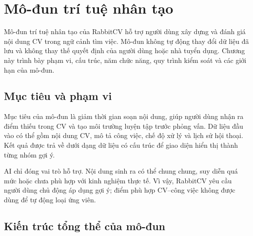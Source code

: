 \chapter{Mô-đun trí tuệ nhân tạo}
\label{chap:ai-module}

Mô-đun trí tuệ nhân tạo của RabbitCV hỗ trợ người dùng xây dựng và đánh giá nội dung CV trong ngữ cảnh tìm việc. Mô-đun không tự động thay đổi dữ liệu đã lưu và không thay thế quyết định của người dùng hoặc nhà tuyển dụng. Chương này trình bày phạm vi, cấu trúc, năm chức năng, quy trình kiểm soát và các giới hạn của mô-đun.

\section{Mục tiêu và phạm vi}

Mục tiêu của mô-đun là giảm thời gian soạn nội dung, giúp người dùng nhận ra điểm thiếu trong CV và tạo môi trường luyện tập trước phỏng vấn. Dữ liệu đầu vào có thể gồm nội dung CV, mô tả công việc, chế độ xử lý và lịch sử hội thoại. Kết quả được trả về dưới dạng dữ liệu có cấu trúc để giao diện hiển thị thành từng nhóm gợi ý.

AI chỉ đóng vai trò hỗ trợ. Nội dung sinh ra có thể chung chung, suy diễn quá mức hoặc chưa phù hợp với kinh nghiệm thực tế. Vì vậy, RabbitCV yêu cầu người dùng chủ động áp dụng gợi ý; điểm phù hợp CV--công việc không được dùng để tự động loại ứng viên.

\section{Kiến trúc tổng thể của mô-đun}

